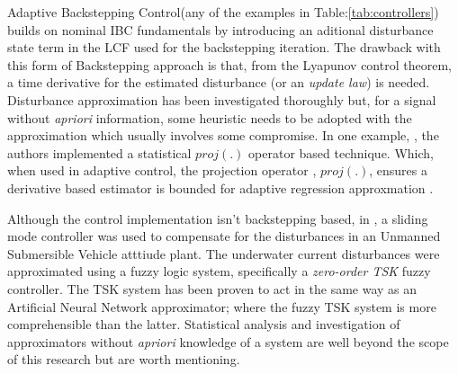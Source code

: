\par
Adaptive Backstepping Control\cite{backstepping}(any of the examples in Table:\ref{tab:controllers}) builds on nominal IBC fundamentals by introducing an aditional disturbance state term in the LCF used for the backstepping iteration. The drawback with this form of Backstepping approach is that, from the Lyapunov control theorem, a time derivative for the estimated disturbance (or an \emph{update law}) is needed. Disturbance approximation has been investigated thoroughly but, for a signal without \emph{apriori} information, some heuristic needs to be adopted with the approximation which usually involves some compromise.
\newpage
In one example, \cite{nonlinearadaptive}, the authors implemented a statistical $proj(.)$ operator based technique. Which, when used in adaptive control, the projection operator \cite{outputfeedback}, $proj(.)$, ensures a derivative based estimator is bounded for adaptive regression approxmation \cite{nonlinearregression}.
\par
Although the control implementation isn't backstepping based, in \cite{adaptiveslidingmode}, a sliding mode controller was used to compensate for the disturbances in an Unmanned Submersible Vehicle atttiude plant. The underwater current disturbances were approximated using a fuzzy logic system, specifically a \emph{zero-order TSK} fuzzy controller. The TSK system has been proven to act in the same way as an Artificial Neural Network approximator\cite{zeroTSK}; where the fuzzy TSK system is more comprehensible than the latter. Statistical analysis and investigation of approximators without \emph{apriori} knowledge of a system are well beyond the scope of this research but are worth mentioning.
